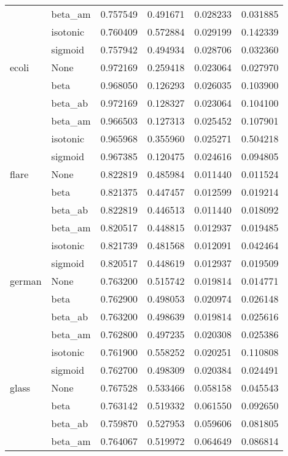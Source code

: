 \begin{tabular}{llrrrr}
        & beta\_am &  0.757549 &  0.491671 &  0.028233 &  0.031885 \\
        & isotonic &  0.760409 &  0.572884 &  0.029199 &  0.142339 \\
        & sigmoid &  0.757942 &  0.494934 &  0.028706 &  0.032360 \\
ecoli & None &  0.972169 &  0.259418 &  0.023064 &  0.027970 \\
        & beta &  0.968050 &  0.126293 &  0.026035 &  0.103900 \\
        & beta\_ab &  0.972169 &  0.128327 &  0.023064 &  0.104100 \\
        & beta\_am &  0.966503 &  0.127313 &  0.025452 &  0.107901 \\
        & isotonic &  0.965968 &  0.355960 &  0.025271 &  0.504218 \\
        & sigmoid &  0.967385 &  0.120475 &  0.024616 &  0.094805 \\
flare & None &  0.822819 &  0.485984 &  0.011440 &  0.011524 \\
        & beta &  0.821375 &  0.447457 &  0.012599 &  0.019214 \\
        & beta\_ab &  0.822819 &  0.446513 &  0.011440 &  0.018092 \\
        & beta\_am &  0.820517 &  0.448815 &  0.012937 &  0.019485 \\
        & isotonic &  0.821739 &  0.481568 &  0.012091 &  0.042464 \\
        & sigmoid &  0.820517 &  0.448619 &  0.012937 &  0.019509 \\
german & None &  0.763200 &  0.515742 &  0.019814 &  0.014771 \\
        & beta &  0.762900 &  0.498053 &  0.020974 &  0.026148 \\
        & beta\_ab &  0.763200 &  0.498639 &  0.019814 &  0.025616 \\
        & beta\_am &  0.762800 &  0.497235 &  0.020308 &  0.025386 \\
        & isotonic &  0.761900 &  0.558252 &  0.020251 &  0.110808 \\
        & sigmoid &  0.762700 &  0.498309 &  0.020384 &  0.024491 \\
glass & None &  0.767528 &  0.533466 &  0.058158 &  0.045543 \\
        & beta &  0.763142 &  0.519332 &  0.061550 &  0.092650 \\
        & beta\_ab &  0.759870 &  0.527953 &  0.059606 &  0.081805 \\
        & beta\_am &  0.764067 &  0.519972 &  0.064649 &  0.086814 \\

\end{tabular}
